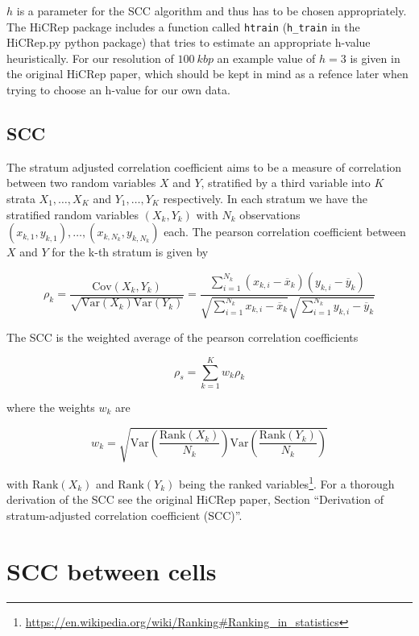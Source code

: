 \(h\) is a parameter for the SCC algorithm and thus has to be chosen appropriately. The HiCRep package includes a function called \verb|htrain| (\verb|h_train| in the HiCRep.py python package) that tries to estimate an appropriate h-value heuristically. For our resolution of \(\SI{100}{kbp}\) an example value of \( h = 3 \) is given in the original HiCRep paper, which should be kept in mind as a refence later when trying to choose an h-value for our own data.


\subsection{SCC} %
\label{subsec:scc}

The stratum adjusted correlation coefficient aims to be a measure of correlation between two random variables \(X\) and \(Y\), stratified by a third variable into \(K\) strata \(X_1, \dots, X_K\) and \(Y_1, \dots, Y_K\) respectively. In each stratum we have the stratified random variables \((X_k, Y_k)\) with \(N_k\) observations \( (x_{k,1}, y_{k,1}), \dots, (x_{k,N_k}, y_{k,N_k}) \) each. The pearson correlation coefficient between \(X\) and \(Y\) for the k-th stratum is given by

\[
  \rho_k = \frac{ \mathrm{Cov}(X_k,Y_k) }{ \sqrt{ \mathrm{Var}(X_k) \mathrm{Var}(Y_k)} } = \frac{ \sum_{i=1}^{N_k} (x_{k,i} - \overbar{x}_k) (y_{k,i} - \overbar{y}_k) }{ \sqrt{ \sum_{i=1}^{N_k} x_{k,i} - \overbar{x}_k } \sqrt{ \sum_{i=1}^{N_k} y_{k,i} - \overbar{y}_k } }
\]

The SCC is the weighted average of the pearson correlation coefficients

\[
  \rho_s = \sum_{k=1}^{K} w_k \rho_k
\]

where the weights \(w_k\) are

\[
  w_k = \sqrt{ \mathrm{Var}\left( \frac{ \mathrm{Rank}(X_k) }{ N_k } \right) \mathrm{Var}\left( \frac{ \mathrm{Rank}(Y_k) }{ N_k } \right) }
\]

with \( \mathrm{Rank}(X_k) \) and \( \mathrm{Rank}(Y_k) \) being the ranked variables\footnote{\url{https://en.wikipedia.org/wiki/Ranking\#Ranking_in_statistics}}. For a thorough derivation of the SCC see the original HiCRep paper\cite{yang_hicrep_2017}, Section \enquote{Derivation of stratum-adjusted correlation coefficient (SCC)}.


\section{SCC between cells} %
\label{sec:scc_between_cells}

